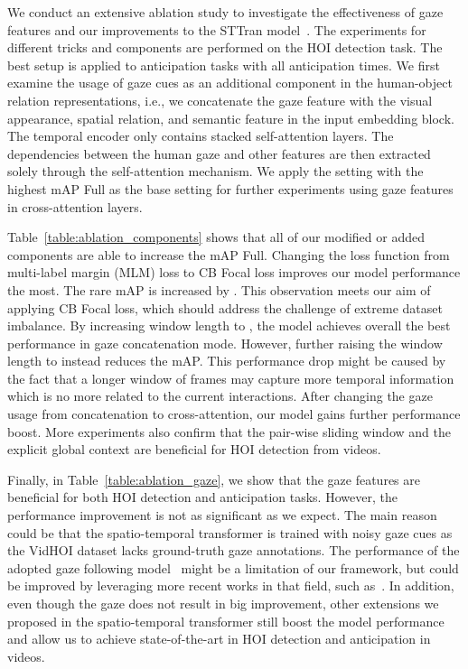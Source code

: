 \documentclass[times,twocolumn,final,authoryear]{elsarticle}
\begin{document}
We conduct an extensive ablation study to investigate the effectiveness of gaze features and our improvements to the STTran model~\citep{hoi_v2:sttran}. The experiments for different tricks and components are performed on the HOI detection task. The best setup is applied to anticipation tasks with all anticipation times. We first examine the usage of gaze cues as an additional component in the human-object relation representations, i.e., we concatenate the gaze feature with the visual appearance, spatial relation, and semantic feature in the input embedding block. The temporal encoder only contains stacked self-attention layers. The dependencies between the human gaze and other features are then extracted solely through the self-attention mechanism. We apply the setting with the highest mAP Full as the base setting for further experiments using gaze features in cross-attention layers.

Table~\ref{table:ablation_components} shows that all of our modified or added components are able to increase the mAP Full. Changing the loss function from multi-label margin (MLM) loss to CB Focal loss improves our model performance the most. The rare mAP is increased by . This observation meets our aim of applying CB Focal loss, which should address the challenge of extreme dataset imbalance. By increasing window length to , the model achieves overall the best performance in gaze concatenation mode. However, further raising the window length to  instead reduces the mAP. This performance drop might be caused by the fact that a longer window of frames may capture more temporal information which is no more related to the current interactions. After changing the gaze usage from concatenation to cross-attention, our model gains further performance boost. More experiments also confirm that the pair-wise sliding window and the explicit global context are beneficial for HOI detection from videos.

Finally, in Table~\ref{table:ablation_gaze}, we show that the gaze features are beneficial for both HOI detection and anticipation tasks. However, the performance improvement is not as significant as we expect. The main reason could be that the spatio-temporal transformer is trained with noisy gaze cues as the VidHOI dataset lacks ground-truth gaze annotations. The performance of the adopted gaze following model~\citep{gaze:detecting_attended} might be a limitation of our framework, but could be improved by leveraging more recent works in that field, such as~\citep{gaze:end_to_end, gaze:dam}. In addition, even though the gaze does not result in big improvement, other extensions we proposed in the spatio-temporal transformer still boost the model performance and allow us to achieve state-of-the-art in HOI detection and anticipation in videos.
\end{document}
